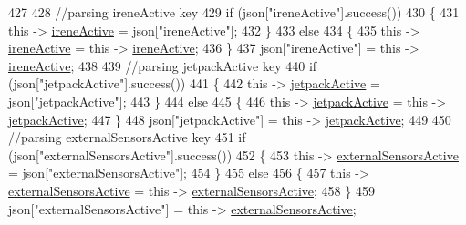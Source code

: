 \begin{DoxyCode}
427             
428             \textcolor{comment}{//parsing ireneActive key           }
429             \textcolor{keywordflow}{if} (json[\textcolor{stringliteral}{"ireneActive"}].success())
430             \{
431                 \textcolor{keyword}{this} -> \hyperlink{classCoolBoard_a9c3f7ac625481ee2ae802a25d97a4ae0}{ireneActive} = json[\textcolor{stringliteral}{"ireneActive"}];
432             \}
433             \textcolor{keywordflow}{else}
434             \{
435                 \textcolor{keyword}{this} -> \hyperlink{classCoolBoard_a9c3f7ac625481ee2ae802a25d97a4ae0}{ireneActive} = \textcolor{keyword}{this} -> \hyperlink{classCoolBoard_a9c3f7ac625481ee2ae802a25d97a4ae0}{ireneActive};
436             \}
437             json[\textcolor{stringliteral}{"ireneActive"}] = \textcolor{keyword}{this} -> \hyperlink{classCoolBoard_a9c3f7ac625481ee2ae802a25d97a4ae0}{ireneActive};
438             
439             \textcolor{comment}{//parsing jetpackActive key}
440             \textcolor{keywordflow}{if} (json[\textcolor{stringliteral}{"jetpackActive"}].success())
441             \{
442                 \textcolor{keyword}{this} -> \hyperlink{classCoolBoard_a9be03a913d26e558328935ca3b59a75e}{jetpackActive} = json[\textcolor{stringliteral}{"jetpackActive"}];
443             \}
444             \textcolor{keywordflow}{else}
445             \{
446                 \textcolor{keyword}{this} -> \hyperlink{classCoolBoard_a9be03a913d26e558328935ca3b59a75e}{jetpackActive} = \textcolor{keyword}{this} -> \hyperlink{classCoolBoard_a9be03a913d26e558328935ca3b59a75e}{jetpackActive};
447             \}
448             json[\textcolor{stringliteral}{"jetpackActive"}] = \textcolor{keyword}{this} -> \hyperlink{classCoolBoard_a9be03a913d26e558328935ca3b59a75e}{jetpackActive};
449 
450             \textcolor{comment}{//parsing externalSensorsActive key}
451             \textcolor{keywordflow}{if} (json[\textcolor{stringliteral}{"externalSensorsActive"}].success())
452             \{
453                 \textcolor{keyword}{this} -> \hyperlink{classCoolBoard_a638b00b76aeb819ecfd4c10b8cdd7bb7}{externalSensorsActive} = json[\textcolor{stringliteral}{"externalSensorsActive"}];
454             \}
455             \textcolor{keywordflow}{else}
456             \{
457                 \textcolor{keyword}{this} -> \hyperlink{classCoolBoard_a638b00b76aeb819ecfd4c10b8cdd7bb7}{externalSensorsActive} = \textcolor{keyword}{this} -> 
      \hyperlink{classCoolBoard_a638b00b76aeb819ecfd4c10b8cdd7bb7}{externalSensorsActive};
458             \}
459             json[\textcolor{stringliteral}{"externalSensorsActive"}] = \textcolor{keyword}{this} -> \hyperlink{classCoolBoard_a638b00b76aeb819ecfd4c10b8cdd7bb7}{externalSensorsActive};

\end{DoxyCode}
